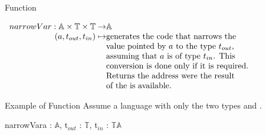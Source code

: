 \begin{bibunit}[apalike]
\begin{frame}{Function }
	\begin{definition}
		$\begin{array}{r@{}l}
			narrowVar : \mathbb{A} \times \mathbb{T} \times \mathbb{T} \rightarrow & \mathbb{A} \\
			(a, t_{out}, t_{in}) \mapsto & \text{generates the code that narrows the} \\
			& \text{value pointed by }a\text{ to the type }t_{out}\text{,} \\
			& \text{assuming that }a\text{ is of type }t_{in}\text{. This} \\
			& \text{conversion is done only if it is required.} \\
			& \text{Returns the address were the result} \\
			& \text{of the is available.} \\
		\end{array}$
	\end{definition}
\end{frame}

\begin{frame}{Example of Function }
	Assume a language with only the two types  and . \\
	\vspace{1em}
	\begin{myfunction}{narrowVar}{a : $\mathbb{A}$, t$_{out}$ : $\mathbb{T}$, t$_{in}$ : $\mathbb{T}$}{$\mathbb{A}$}
	\end{myfunction}
\end{frame}


\end{bibunit}
